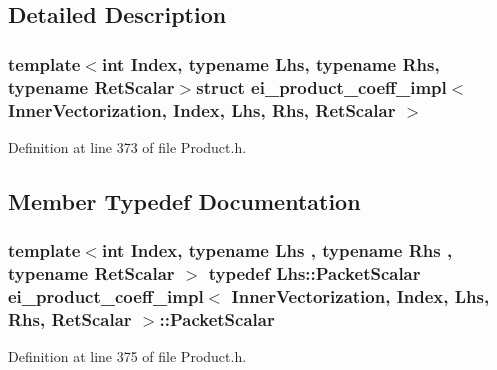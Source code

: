 \subsection{Detailed Description}
\subsubsection*{template$<$int Index, typename Lhs, typename Rhs, typename Ret\-Scalar$>$struct ei\-\_\-product\-\_\-coeff\-\_\-impl$<$ Inner\-Vectorization, Index, Lhs, Rhs, Ret\-Scalar $>$}



Definition at line 373 of file Product.\-h.



\subsection{Member Typedef Documentation}
\hypertarget{structei__product__coeff__impl_3_01_inner_vectorization_00_01_index_00_01_lhs_00_01_rhs_00_01_ret_scalar_01_4_a5cda08de18a97d0acd724abeecf02be6}{
\subsubsection[{Packet\-Scalar}]{\setlength{\rightskip}{0pt plus 5cm}template$<$int Index, typename Lhs , typename Rhs , typename Ret\-Scalar $>$ typedef Lhs\-::\-Packet\-Scalar {\bf ei\-\_\-product\-\_\-coeff\-\_\-impl}$<$ {\bf Inner\-Vectorization}, Index, Lhs, Rhs, Ret\-Scalar $>$\-::{\bf Packet\-Scalar}}}\label{structei__product__coeff__impl_3_01_inner_vectorization_00_01_index_00_01_lhs_00_01_rhs_00_01_ret_scalar_01_4_a5cda08de18a97d0acd724abeecf02be6}


Definition at line 375 of file Product.\-h.



